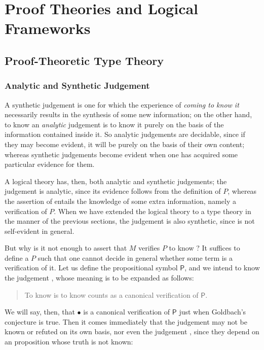 \documentclass[main.tex]{subfiles}
\begin{document}
\onehalfspacing

\chapter{Proof Theories and Logical Frameworks}

\section{Proof-Theoretic Type Theory}

\subsection{Analytic and Synthetic Judgement}

A synthetic judgement is one for which the experience of \emph{coming to know
it} necessarily results in the synthesis of some new information; on the other
hand, to know an \emph{analytic} judgement is to know it purely on the basis of
the information contained inside it. So analytic judgements are decidable,
since if they may become evident, it will be purely on the basis of their own
content; whereas synthetic judgements become evident when one has acquired some
particular evidence for them.

A logical theory has, then, both analytic and synthetic judgements; the
judgement  is analytic, since its evidence follows from the
definition of $P$, whereas the assertion of  entails the knowledge of
some extra information, namely a verification of $P$. When we have extended the
logical theory to a type theory in the manner of the previous sections, the
judgement  is also synthetic, since  is not self-evident in
general.

But why is it not enough to assert that $M$ verifies $P$ to know ? It
suffices to define a $P$ such that one cannot decide in general whether some
term is a verification of it. Let us define the propositional symbol
$\mathsf{P}$, and we intend to know the judgement , whose
meaning is to be expanded as follows:
\begin{quote}
  To know  is to know counts as a canonical verification of $\mathsf{P}$.
\end{quote}

We will say, then, that $\bullet$ is a canonical verification of $\mathsf{P}$
just when Goldbach's conjecture is true. Then it comes immediately that the
judgement  may not be known or refuted on its own basis, nor
even the judgement , since they depend on an
proposition whose truth is not known:
\end{document}
